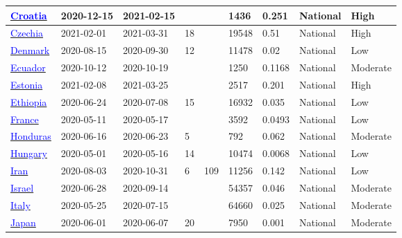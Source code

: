 \begin{table}[!ht]
\begin{center}
\begin{tabular}{p{2cm} | p{1.6cm} | p{1.6cm} | p{0.8cm} | p{0.8cm} | p{1cm} | p{1.3cm} | p{1.2cm} | p{1.2cm}}
\hline 
\href{https://dx.doi.org/10.3390/pathogens10060774}{\textcolor{blue}{Croatia}} & 2020-12-15 & 2021-02-15 &  &  & 1436 & 0.251 & National & High \\ 
\hline 
\href{https://doi.org/10.1038/s43856-022-00080-0}{\textcolor{blue}{Czechia}} & 2021-02-01 & 2021-03-31 & 18 &  & 19548 & 0.51 & National & High \\ 
\hline 
\href{https://dx.doi.org/10.1007/s10654-021-00796-8}{\textcolor{blue}{Denmark}} & 2020-08-15 & 2020-09-30 & 12 &  & 11478 & 0.02 & National & Low \\ 
\hline 
\href{https://dx.doi.org/10.3389/fmed.2022.933260}{\textcolor{blue}{Ecuador}} & 2020-10-12 & 2020-10-19 &  &  & 1250 & 0.1168 & National & Moderate \\ 
\hline 
\href{https://dx.doi.org/10.1080/23744235.2021.1974540}{\textcolor{blue}{Estonia}} & 2021-02-08 & 2021-03-25 &  &  & 2517 & 0.201 & National & High \\ 
\hline 
\href{http://dx.doi.org/10.1016/j.ijid.2021.08.028}{\textcolor{blue}{Ethiopia}} & 2020-06-24 & 2020-07-08 & 15 &  & 16932 & 0.035 & National & Low \\ 
\hline 
\href{https://dx.doi.org/10.1038/s41467-021-23233-6}{\textcolor{blue}{France}} & 2020-05-11 & 2020-05-17 &  &  & 3592 & 0.0493 & National & Low \\ 
\hline 
\href{https://revistas.ucr.ac.cr/index.php/psm/article/view/43261/46175}{\textcolor{blue}{Honduras}} & 2020-06-16 & 2020-06-23 & 5 &  & 792 & 0.062 & National & Moderate \\ 
\hline 
\href{https://dx.doi.org/10.1007/s11357-020-00226-9}{\textcolor{blue}{Hungary}} & 2020-05-01 & 2020-05-16 & 14 &  & 10474 & 0.0068 & National & Low \\ 
\hline 
\href{http://dx.doi.org/10.1016/j.cmi.2021.06.002}{\textcolor{blue}{Iran}} & 2020-08-03 & 2020-10-31 & 6 & 109 & 11256 & 0.142 & National & Low \\ 
\hline 
\href{https://dx.doi.org/10.1007/s10654-021-00749-1}{\textcolor{blue}{Israel}} & 2020-06-28 & 2020-09-14 &  &  & 54357 & 0.046 & National & Moderate \\ 
\hline 
\href{https://www.istat.it/it/files//2020/08/ReportPrimiRisultatiIndagineSiero.pdf}{\textcolor{blue}{Italy}} & 2020-05-25 & 2020-07-15 &  &  & 64660 & 0.025 & National & Moderate \\ 
\hline 
\href{https://dx.doi.org/10.3201/eid2702.204088}{\textcolor{blue}{Japan}} & 2020-06-01 & 2020-06-07 & 20 &  & 7950 & 0.001 & National & Moderate \\ 

\end{tabular}
\end{center}
\end{table}
